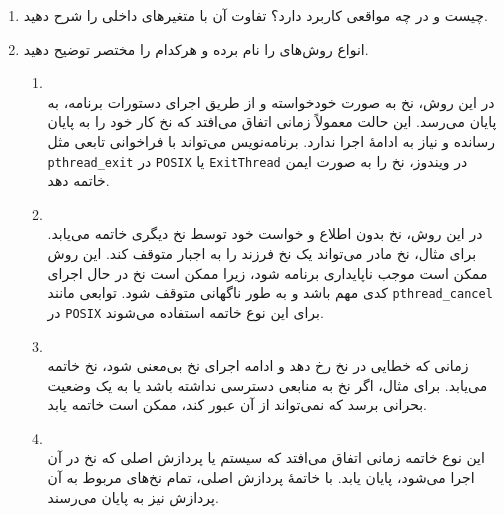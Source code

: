 \begin{enumerate}
	
	\item 
	  چیست و در چه مواقعی کاربرد دارد؟ تفاوت آن با متغیرهای داخلی را شرح دهید.
	
	\begin{qsolve}
		
	\end{qsolve}
	
	\item 
	انواع روش‌های  را نام برده و هرکدام را مختصر توضیح دهید.
	\begin{qsolve}
		\begin{enumerate}
			\item 
			\textbf{}\\
			 در این روش، نخ به صورت خودخواسته و از طریق اجرای دستورات برنامه، به پایان می‌رسد. این حالت معمولاً زمانی اتفاق می‌افتد که نخ کار خود را به پایان رسانده و نیاز به ادامهٔ اجرا ندارد. برنامه‌نویس می‌تواند با فراخوانی تابعی مثل \texttt{pthread\_exit} در \texttt{POSIX} یا \texttt{ExitThread} در ویندوز، نخ را به صورت ایمن خاتمه دهد.
			
			\item 
			\textbf{}\\
			در این روش، نخ بدون اطلاع و خواست خود توسط نخ دیگری خاتمه می‌یابد. برای مثال، نخ مادر می‌تواند یک نخ فرزند را به اجبار متوقف کند. این روش ممکن است موجب ناپایداری برنامه شود، زیرا ممکن است نخ در حال اجرای کدی مهم باشد و به طور ناگهانی متوقف شود. توابعی مانند \texttt{pthread\_cancel} در \texttt{POSIX} برای این نوع خاتمه استفاده می‌شوند.
			
			\item 
			\textbf{}\\
			زمانی که خطایی در نخ رخ دهد و ادامه اجرای نخ بی‌معنی شود، نخ خاتمه می‌یابد. برای مثال، اگر نخ به منابعی دسترسی نداشته باشد یا به یک وضعیت بحرانی برسد که نمی‌تواند از آن عبور کند، ممکن است خاتمه یابد.
			
			
			\item 
			\textbf{}\\
			این نوع خاتمه زمانی اتفاق می‌افتد که سیستم یا پردازش اصلی که نخ در آن اجرا می‌شود، پایان یابد. با خاتمهٔ پردازش اصلی، تمام نخ‌های مربوط به آن پردازش نیز به پایان می‌رسند.
		\end{enumerate}
	\end{qsolve}
	
\end{enumerate}